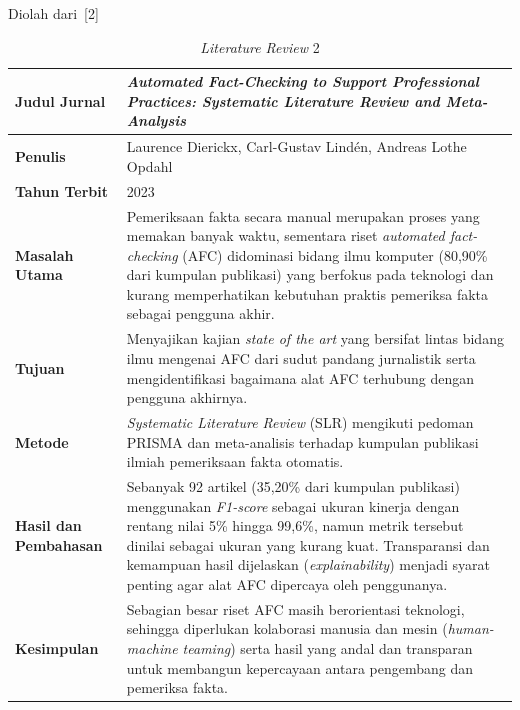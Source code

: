 \documentclass[12pt,a4paper,twoside]{report}
\begin{document}
\clearpage
\begin{table}[H]
  \centering
  \caption{\textit{Literature Review} 2}
  \label{tab:sota2}
  \par\nopagebreak\vspace{2pt}Diolah dari~[2]\par\vspace{4pt}
  \begin{spacing}{1.0}
  \normalsize
  \begin{tabular}{|L{119.5pt}|L{251.5pt}|}
    \hline
    \textbf{Judul Jurnal} & \raggedright\arraybackslash \textit{Automated Fact-Checking to Support Professional Practices: Systematic Literature Review and Meta-Analysis} \\ \hline
    \textbf{Penulis} & \raggedright\arraybackslash Laurence Dierickx, Carl-Gustav Lind\'{e}n, Andreas Lothe Opdahl \\ \hline
    \textbf{Tahun Terbit} & 2023 \\ \hline
    \textbf{Masalah Utama} & Pemeriksaan fakta secara manual merupakan proses yang memakan banyak waktu, sementara riset \textit{automated fact-checking} (AFC) didominasi bidang ilmu komputer (80,90\% dari kumpulan publikasi) yang berfokus pada teknologi dan kurang memperhatikan kebutuhan praktis pemeriksa fakta sebagai pengguna akhir. \\ \hline
    \textbf{Tujuan} & Menyajikan kajian \textit{state of the art} yang bersifat lintas bidang ilmu mengenai AFC dari sudut pandang jurnalistik serta mengidentifikasi bagaimana alat AFC terhubung dengan pengguna akhirnya. \\ \hline
    \textbf{Metode} & \textit{Systematic Literature Review} (SLR) mengikuti pedoman PRISMA dan meta-analisis terhadap kumpulan publikasi ilmiah pemeriksaan fakta otomatis. \\ \hline
    \textbf{Hasil dan Pembahasan} & Sebanyak 92 artikel (35,20\% dari kumpulan publikasi) menggunakan \textit{F1-score} sebagai ukuran kinerja dengan rentang nilai 5\% hingga 99,6\%, namun metrik tersebut dinilai sebagai ukuran yang kurang kuat. Transparansi dan kemampuan hasil dijelaskan (\textit{explainability}) menjadi syarat penting agar alat AFC dipercaya oleh penggunanya. \\ \hline
    \textbf{Kesimpulan} & Sebagian besar riset AFC masih berorientasi teknologi, sehingga diperlukan kolaborasi manusia dan mesin (\textit{human-machine teaming}) serta hasil yang andal dan transparan untuk membangun kepercayaan antara pengembang dan pemeriksa fakta. \\ \hline
  \end{tabular}
  \end{spacing}
\end{table}
\end{document}

